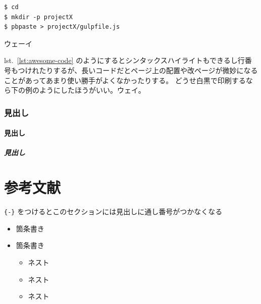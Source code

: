 \begin{lstlisting}
$ cd
$ mkdir -p projectX
$ pbpaste > projectX/gulpfile.js
\end{lstlisting}

ウェーイ

lst.~\ref{lst:awesome-code}
のようにするとシンタックスハイライトもできるし行番号もつけれたりするが、長いコードだとページ上の配置や改ページが微妙になることがあってあまり使い勝手がよくなかったりする。
どうせ白黒で印刷するなら下の例のようにしたほうがいい。ウェイ。

\hypertarget{ux898bux51faux3057-2}{%
\subsubsection{見出し}\label{ux898bux51faux3057-2}}

\hypertarget{ux898bux51faux3057-3}{%
\paragraph{見出し}\label{ux898bux51faux3057-3}}

\hypertarget{ux898bux51faux3057-4}{%
\subparagraph{見出し}\label{ux898bux51faux3057-4}}

\hypertarget{ux53c2ux8003ux6587ux732e}{%
\section*{参考文献}\label{ux53c2ux8003ux6587ux732e}}

\texttt{\{-\}}
をつけるとこのセクションには見出しに通し番号がつかなくなる

\begin{itemize}


\item
  箇条書き
\item
  箇条書き

  \begin{itemize}
  

  \item
    ネスト
  \item
    ネスト
  \item
    ネスト
  \end{itemize}
\end{itemize}
